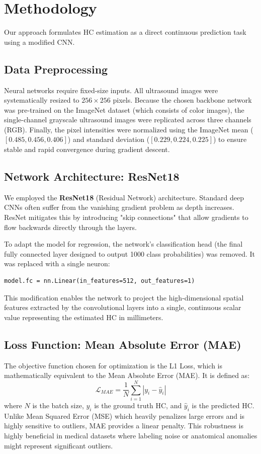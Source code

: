 \documentclass[10pt,twocolumn,letterpaper]{article}
\begin{document}
\section{Methodology}
Our approach formulates HC estimation as a direct continuous prediction task using a modified CNN.

\subsection{Data Preprocessing}
Neural networks require fixed-size inputs. All ultrasound images were systematically resized to $256 \times 256$ pixels. Because the chosen backbone network was pre-trained on the ImageNet dataset (which consists of color images), the single-channel grayscale ultrasound images were replicated across three channels (RGB). Finally, the pixel intensities were normalized using the ImageNet mean ($[0.485, 0.456, 0.406]$) and standard deviation ($[0.229, 0.224, 0.225]$) to ensure stable and rapid convergence during gradient descent.

\subsection{Network Architecture: ResNet18}
We employed the \textbf{ResNet18} (Residual Network) architecture. Standard deep CNNs often suffer from the vanishing gradient problem as depth increases. ResNet mitigates this by introducing "skip connections" that allow gradients to flow backwards directly through the layers. 

To adapt the model for regression, the network's classification head (the final fully connected layer designed to output 1000 class probabilities) was removed. It was replaced with a single neuron:
\begin{verbatim}
model.fc = nn.Linear(in_features=512, out_features=1)
\end{verbatim}
This modification enables the network to project the high-dimensional spatial features extracted by the convolutional layers into a single, continuous scalar value representing the estimated HC in millimeters.

\subsection{Loss Function: Mean Absolute Error (MAE)}
The objective function chosen for optimization is the L1 Loss, which is mathematically equivalent to the Mean Absolute Error (MAE). It is defined as:
$$ \mathcal{L}_{MAE} = \frac{1}{N} \sum_{i=1}^{N} |y_i - \hat{y}_i| $$
where $N$ is the batch size, $y_i$ is the ground truth HC, and $\hat{y}_i$ is the predicted HC. Unlike Mean Squared Error (MSE) which heavily penalizes large errors and is highly sensitive to outliers, MAE provides a linear penalty. This robustness is highly beneficial in medical datasets where labeling noise or anatomical anomalies might represent significant outliers.
\end{document}
